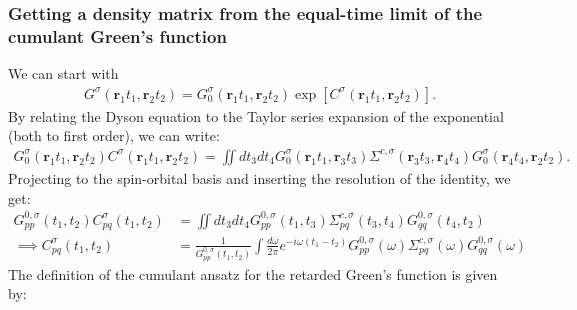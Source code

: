 \subsubsection{Getting a density matrix from the equal-time limit of the cumulant Green's function }
We can start with 
\begin{align}
    G^\sigma\left(\mathbf{r}_1 t_1, \mathbf{r}_2 t_2\right)=G_0^\sigma\left(\mathbf{r}_1 t_1, \mathbf{r}_2 t_2\right)\exp\left[C^\sigma\left(\mathbf{r}_1 t_1, \mathbf{r}_2 t_2\right)\right].
\end{align}
By relating the Dyson equation to the Taylor series expansion of the exponential (both to first order), we can write:
\begin{align}
    G_0^\sigma\left(\mathbf{r}_1 t_1, \mathbf{r}_2 t_2\right) C^\sigma\left(\mathbf{r}_1 t_1, \mathbf{r}_2 t_2\right) = \iint d t_3 d t_4 G_0^\sigma\left(\mathbf{r}_1 t_1, \mathbf{r}_3 t_3\right) \Sigma^{c,\sigma}\left(\mathbf{r}_3 t_3, \mathbf{r}_4 t_4\right) G_0^\sigma\left(\mathbf{r}_4 t_4, \mathbf{r}_2 t_2\right).
\end{align}
Projecting to the spin-orbital basis and inserting the resolution of the identity, we get:
\begin{align}
    G_{pp}^{0,\sigma}\left(t_1, t_2\right) C_{pq}^\sigma\left(t_1, t_2\right) &= {\iint d t_3 d t_4 G_{pp}^{0,\sigma}\left(t_1, t_3\right) \Sigma_{pq}^{c,\sigma}\left(t_3, t_4\right) G_{qq}^{0,\sigma}\left(t_4, t_2\right)}\\
\implies C_{pq}^\sigma\left(t_1, t_2\right) &= \frac{1}{G_{pp}^{0,\sigma}\left(t_1, t_2\right)} \int \frac{d\omega}{2\pi} e^{-i\omega (t_1 - t_2)} G_{pp}^{0,\sigma}(\omega) \Sigma_{pq}^{c,\sigma}(\omega) G_{qq}^{0,\sigma}(\omega)
    \label{eqn:cumulant_connection}
\end{align}
The definition of the cumulant ansatz for the retarded Green's function is given by:
